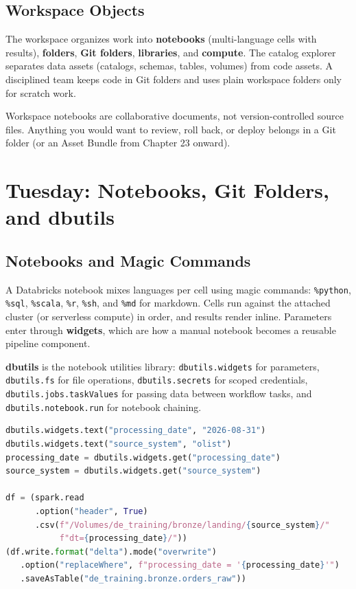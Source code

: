 \subsection{Workspace Objects}
The workspace organizes work into \textbf{notebooks} (multi-language cells with results), \textbf{folders}, \textbf{Git folders}, \textbf{libraries}, and \textbf{compute}. The catalog explorer separates data assets (catalogs, schemas, tables, volumes) from code assets. A disciplined team keeps code in Git folders and uses plain workspace folders only for scratch work.

\begin{notebox}
Workspace notebooks are collaborative documents, not version-controlled source files. Anything you would want to review, roll back, or deploy belongs in a Git folder (or an Asset Bundle from Chapter 23 onward).
\end{notebox}

\section{Tuesday: Notebooks, Git Folders, and dbutils}
\subsection{Notebooks and Magic Commands}
A Databricks notebook mixes languages per cell using magic commands: \texttt{\%python}, \texttt{\%sql}, \texttt{\%scala}, \texttt{\%r}, \texttt{\%sh}, and \texttt{\%md} for markdown. Cells run against the attached cluster (or serverless compute) in order, and results render inline. Parameters enter through \textbf{widgets}, which are how a manual notebook becomes a reusable pipeline component.

\begin{definitionbox}
\textbf{dbutils} is the notebook utilities library: \texttt{dbutils.widgets} for parameters, \texttt{dbutils.fs} for file operations, \texttt{dbutils.secrets} for scoped credentials, \texttt{dbutils.jobs.taskValues} for passing data between workflow tasks, and \texttt{dbutils.notebook.run} for notebook chaining.
\end{definitionbox}

\begin{lstlisting}[language=Python,caption={Parameterized notebook pattern used throughout the book.},label={lst:ch1-widgets}]
dbutils.widgets.text("processing_date", "2026-08-31")
dbutils.widgets.text("source_system", "olist")
processing_date = dbutils.widgets.get("processing_date")
source_system = dbutils.widgets.get("source_system")

df = (spark.read
      .option("header", True)
      .csv(f"/Volumes/de_training/bronze/landing/{source_system}/"
           f"dt={processing_date}/"))
(df.write.format("delta").mode("overwrite")
   .option("replaceWhere", f"processing_date = '{processing_date}'")
   .saveAsTable("de_training.bronze.orders_raw"))
\end{lstlisting}

